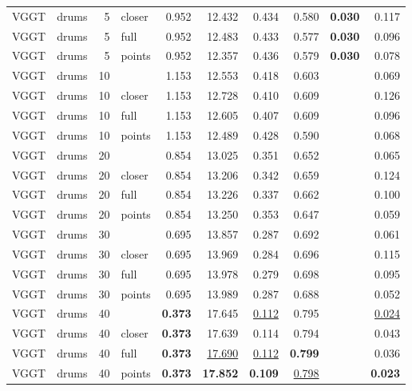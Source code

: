 \begin{table}[H]
\begin{tabular}{llrlrrrrrr}
VGGT & drums & 5 & closer & 0.952 & 12.432 & 0.434 & 0.580 & \textbf{0.030} & 0.117 \\
VGGT & drums & 5 & full & 0.952 & 12.483 & 0.433 & 0.577 & \textbf{0.030} & 0.096 \\
VGGT & drums & 5 & points & 0.952 & 12.357 & 0.436 & 0.579 & \textbf{0.030} & 0.078 \\
VGGT & drums & 10 &  & 1.153 & 12.553 & 0.418 & 0.603 &  & 0.069 \\
VGGT & drums & 10 & closer & 1.153 & 12.728 & 0.410 & 0.609 &  & 0.126 \\
VGGT & drums & 10 & full & 1.153 & 12.605 & 0.407 & 0.609 &  & 0.096 \\
VGGT & drums & 10 & points & 1.153 & 12.489 & 0.428 & 0.590 &  & 0.068 \\
VGGT & drums & 20 &  & 0.854 & 13.025 & 0.351 & 0.652 &  & 0.065 \\
VGGT & drums & 20 & closer & 0.854 & 13.206 & 0.342 & 0.659 &  & 0.124 \\
VGGT & drums & 20 & full & 0.854 & 13.226 & 0.337 & 0.662 &  & 0.100 \\
VGGT & drums & 20 & points & 0.854 & 13.250 & 0.353 & 0.647 &  & 0.059 \\
VGGT & drums & 30 &  & 0.695 & 13.857 & 0.287 & 0.692 &  & 0.061 \\
VGGT & drums & 30 & closer & 0.695 & 13.969 & 0.284 & 0.696 &  & 0.115 \\
VGGT & drums & 30 & full & 0.695 & 13.978 & 0.279 & 0.698 &  & 0.095 \\
VGGT & drums & 30 & points & 0.695 & 13.989 & 0.287 & 0.688 &  & 0.052 \\
VGGT & drums & 40 &  & \textbf{0.373} & 17.645 & \underline{0.112} & 0.795 &  & \underline{0.024} \\
VGGT & drums & 40 & closer & \textbf{0.373} & 17.639 & 0.114 & 0.794 &  & 0.043 \\
VGGT & drums & 40 & full & \textbf{0.373} & \underline{17.690} & \underline{0.112} & \textbf{0.799} &  & 0.036 \\
VGGT & drums & 40 & points & \textbf{0.373} & \textbf{17.852} & \textbf{0.109} & \underline{0.798} &  & \textbf{0.023} \\
\bottomrule
\end{tabular}
\end{table}